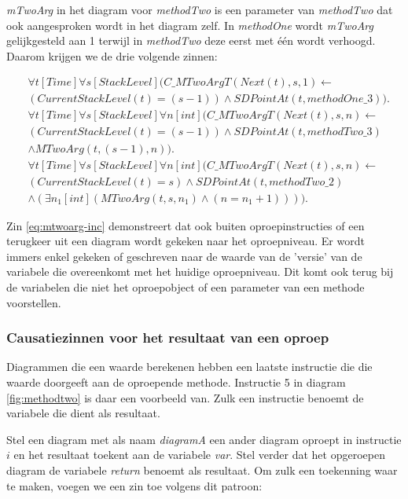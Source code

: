 \textit{mTwoArg} in het diagram voor \textit{methodTwo} is een parameter van \textit{methodTwo} dat ook aangesproken wordt in het diagram zelf. In \textit{methodOne} wordt \textit{mTwoArg} gelijkgesteld aan 1 terwijl in \textit{methodTwo} deze eerst met \'e\'en wordt verhoogd. Daarom krijgen we de drie volgende zinnen:

\begin{align}
	\nonumber &\forall{t}[Time]\forall{s}[StackLevel](C\_MTwoArgT(Next(t), s, 1) \leftarrow \\ &(CurrentStackLevel(t) = (s-1)) \land SDPointAt(t, methodOne\_3)). \\
	\nonumber &\forall{t}[Time]\forall{s}[StackLevel]\forall{n}[int](C\_MTwoArgT(Next(t), s, n) \leftarrow \\ \nonumber &(CurrentStackLevel(t) = (s-1)) \land SDPointAt(t, methodTwo\_3) \\ &\land MTwoArg(t, (s-1), n)). \\
	\nonumber &\forall{t}[Time]\forall{s}[StackLevel]\forall{n}[int](C\_MTwoArgT(Next(t), s, n) \leftarrow \\ \nonumber &(CurrentStackLevel(t) = s) \land SDPointAt(t, methodTwo\_2) \\ &\land (\exists{n_1}[int](MTwoArg(t, s, n_1) \land (n = n_1 + 1)))).\label{eq:mtwoarg-inc}
\end{align}

Zin \ref{eq:mtwoarg-inc} demonstreert dat ook buiten oproepinstructies of een terugkeer uit een diagram wordt gekeken naar het oproepniveau. Er wordt immers enkel gekeken of geschreven naar de waarde van de 'versie' van de variabele die overeenkomt met het huidige oproepniveau. Dit komt ook terug bij de variabelen die niet het oproepobject of een parameter van een methode voorstellen.

\subsubsection{Causatiezinnen voor het resultaat van een oproep}

Diagrammen die een waarde berekenen hebben een laatste instructie die die waarde doorgeeft aan de oproepende methode. Instructie 5 in diagram \ref{fig:methodtwo} is daar een voorbeeld van. Zulk een instructie benoemt de variabele die dient als resultaat.

Stel een diagram met als naam \textit{diagramA} een ander diagram oproept in instructie $i$ en het resultaat toekent aan de variabele \textit{var}. Stel verder dat het opgeroepen diagram de variabele \textit{return} benoemt als resultaat. Om zulk een toekenning waar te maken, voegen we een zin toe volgens dit patroon:

